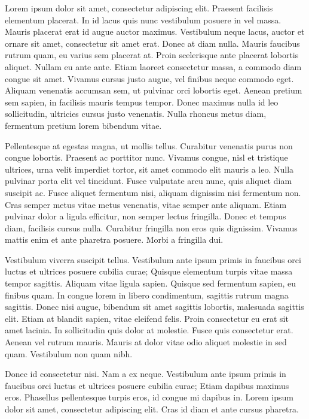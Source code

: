 \documentclass[12pt]{article}
\begin{document}
Lorem ipsum dolor sit amet, consectetur adipiscing elit. Praesent facilisis elementum placerat. In id lacus quis nunc vestibulum posuere in vel massa. Mauris placerat erat id augue auctor maximus. Vestibulum neque lacus, auctor et ornare sit amet, consectetur sit amet erat. Donec at diam nulla. Mauris faucibus rutrum quam, eu varius sem placerat at. Proin scelerisque ante placerat lobortis aliquet. Nullam eu ante ante. Etiam laoreet consectetur massa, a commodo diam congue sit amet. Vivamus cursus justo augue, vel finibus neque commodo eget. Aliquam venenatis accumsan sem, ut pulvinar orci lobortis eget. Aenean pretium sem sapien, in facilisis mauris tempus tempor. Donec maximus nulla id leo sollicitudin, ultricies cursus justo venenatis. Nulla rhoncus metus diam, fermentum pretium lorem bibendum vitae.

Pellentesque at egestas magna, ut mollis tellus. Curabitur venenatis purus non congue lobortis. Praesent ac porttitor nunc. Vivamus congue, nisl et tristique ultrices, urna velit imperdiet tortor, sit amet commodo elit mauris a leo. Nulla pulvinar porta elit vel tincidunt. Fusce vulputate arcu nunc, quis aliquet diam suscipit ac. Fusce aliquet fermentum nisi, aliquam dignissim nisi fermentum non. Cras semper metus vitae metus venenatis, vitae semper ante aliquam. Etiam pulvinar dolor a ligula efficitur, non semper lectus fringilla. Donec et tempus diam, facilisis cursus nulla. Curabitur fringilla non eros quis dignissim. Vivamus mattis enim et ante pharetra posuere. Morbi a fringilla dui.

Vestibulum viverra suscipit tellus. Vestibulum ante ipsum primis in faucibus orci luctus et ultrices posuere cubilia curae; Quisque elementum turpis vitae massa tempor sagittis. Aliquam vitae ligula sapien. Quisque sed fermentum sapien, eu finibus quam. In congue lorem in libero condimentum, sagittis rutrum magna sagittis. Donec nisi augue, bibendum sit amet sagittis lobortis, malesuada sagittis elit. Etiam at blandit sapien, vitae eleifend felis. Proin consectetur eu erat sit amet lacinia. In sollicitudin quis dolor at molestie. Fusce quis consectetur erat. Aenean vel rutrum mauris. Mauris at dolor vitae odio aliquet molestie in sed quam. Vestibulum non quam nibh.

Donec id consectetur nisi. Nam a ex neque. Vestibulum ante ipsum primis in faucibus orci luctus et ultrices posuere cubilia curae; Etiam dapibus maximus eros. Phasellus pellentesque turpis eros, id congue mi dapibus in. Lorem ipsum dolor sit amet, consectetur adipiscing elit. Cras id diam et ante cursus pharetra.
\end{document}
